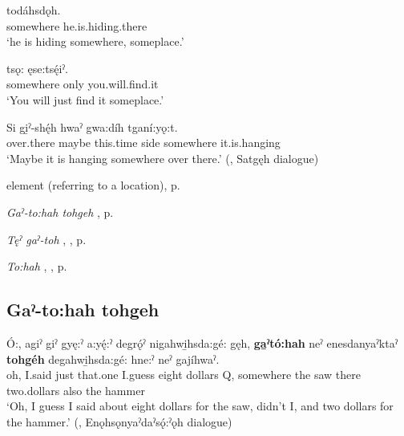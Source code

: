 \ea
\label{ex:gpart2}
\gll {} todáhsdǫh.\\
somewhere he.is.hiding.there\\
\glt ‘he is hiding somewhere, someplace.’
\z

\ea
\label{ex:gpart3}
\gll {} tsǫ: ęse:tsę́iˀ.\\
somewhere only you.will.find.it\\
\glt ‘You will just find it someplace.’
\z

\ea
\label{ex:gpart4}
\gll Si gi̱ˀ-shę́h hwaˀ gwa:díh  tganí:yǫ:t.\\
over.there maybe this.time side somewhere it.is.hanging\\
\glt ‘Maybe it is hanging somewhere over there.’ (\cite[142]{mithun_watewayestanih_1984}, Satgęh dialogue)
\z

\begin{CayugaRelated}
\item {} element (referring to a location), p. \pageref{p:[gaˀ-]}\\
\item\textit{Gaˀ-to:hah tohgeh} , p. \pageref{p:[gaˀ-to:hah tohgeh]}\\
\item\textit{Tęˀ gaˀ-toh} , , p. \pageref{p:[tęˀ gaˀ-toh]}\\
\item\textit{To:hah} , , p. \pageref{p:[to:hah]}
\end{CayugaRelated}

\subsection*{\textbf{Gaˀ-to:hah tohgeh} } \label{p:[gaˀ-to:hah tohgeh]}

\ea
\label{ex:gpart5}
\gll Ó:, agiˀ giˀ gyę:ˀ a:yę́:ˀ degrǫ́ˀ nigahwi̱hsda:gé: gęh, \textbf{ga̱ˀtó:hah} neˀ enesdanyaˀktaˀ \textbf{tohgéh} degahwi̱hsda:gé: hne:ˀ neˀ gajíhwaˀ.\\
oh, I.said just that.one I.guess eight dollars Q, somewhere the saw there two.dollars also the hammer\\
\glt ‘Oh, I guess I said about eight dollars for the saw, didn’t I, and two dollars for the hammer.’ (\cite[159]{mithun_watewayestanih_1984}, Enǫhsǫnyaˀdaˀsǫ́:ˀǫh dialogue)
\z

